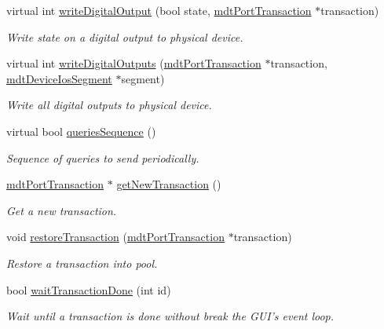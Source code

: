 \begin{DoxyCompactItemize}
virtual int \hyperlink{classmdt_device_a0fbe57503d86554829e708b2b83d73f1}{write\-Digital\-Output} (bool state, \hyperlink{classmdt_port_transaction}{mdt\-Port\-Transaction} $\ast$transaction)
\begin{DoxyCompactList}\small\item\em Write state on a digital output to physical device. \end{DoxyCompactList}\item 
virtual int \hyperlink{classmdt_device_ae644ab1ef0ebb57d6d9d502829907ec1}{write\-Digital\-Outputs} (\hyperlink{classmdt_port_transaction}{mdt\-Port\-Transaction} $\ast$transaction, \hyperlink{classmdt_device_ios_segment}{mdt\-Device\-Ios\-Segment} $\ast$segment)
\begin{DoxyCompactList}\small\item\em Write all digital outputs to physical device. \end{DoxyCompactList}\item 
virtual bool \hyperlink{classmdt_device_acba50968d201ad95c4eaa2ab2ed48b4f}{queries\-Sequence} ()
\begin{DoxyCompactList}\small\item\em Sequence of queries to send periodically. \end{DoxyCompactList}\item 
\hyperlink{classmdt_port_transaction}{mdt\-Port\-Transaction} $\ast$ \hyperlink{classmdt_device_a0e57cc8b749581cff447d514b9a1ff8e}{get\-New\-Transaction} ()
\begin{DoxyCompactList}\small\item\em Get a new transaction. \end{DoxyCompactList}\item 
void \hyperlink{classmdt_device_a4619d8be240cafe48865a89f7424de92}{restore\-Transaction} (\hyperlink{classmdt_port_transaction}{mdt\-Port\-Transaction} $\ast$transaction)
\begin{DoxyCompactList}\small\item\em Restore a transaction into pool. \end{DoxyCompactList}\item 
bool \hyperlink{classmdt_device_ab937015c1a319b7234442a4cc29a02a8}{wait\-Transaction\-Done} (int id)
\begin{DoxyCompactList}\small\item\em Wait until a transaction is done without break the G\-U\-I's event loop. \end{DoxyCompactList}\end{DoxyCompactItemize}


